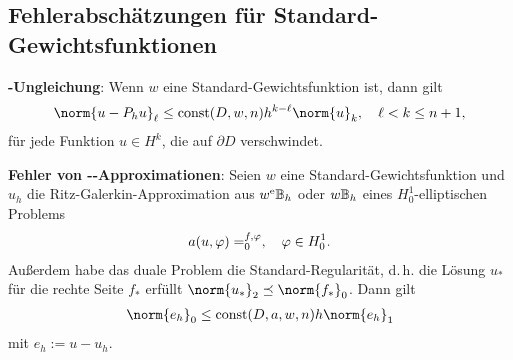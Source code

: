 \subsection{%
    Fehlerabschätzungen für Standard-Gewichtsfunktionen%
}

\textbf{-Ungleichung}:
Wenn $w$ eine Standard-Gewichtsfunktion ist, dann gilt
\begin{align*}
    \norm{u - P_h u}_\ell \le \const(D, w, n) h^{k-\ell} \norm{u}_k,\quad
    \ell < k \le n + 1,
\end{align*}
für jede Funktion $u \in H^k$, die auf $\partial D$ verschwindet.

\textbf{Fehler von --Approximationen}:
Seien $w$ eine Standard-Gewichtsfunktion und
$u_h$ die Ritz-Galerkin-Approximation aus $w^{\mathrm{e}}\mathbb{B}_h$ oder $w\mathbb{B}_h$ eines $H_0^1$-elliptischen
Problems
\begin{align*}
    a(u, \varphi) = \sp{f, \varphi}_0,\quad
    \varphi \in H_0^1.
\end{align*}
Außerdem habe das duale Problem die Standard-Regularität, d.\,h.
die Lösung $u_\ast$ für die rechte Seite $f_\ast$ erfüllt
$\norm{u_\ast}_2 \preceq \norm{f_\ast}_0$.
Dann gilt
\begin{align*}
    \norm{e_h}_0
    \le \const(D, a, w, n) h \norm{e_h}_1
\end{align*}
mit $e_h := u - u_h$.

\pagebreak
